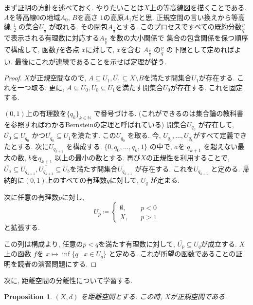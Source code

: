 \documentclass[lualatex]{ltjsbook}
\newcommand{\cl}[1]{\overline{ #1}  }
\newtheorem{proposition}[theorem]{Proposition}
\theoremstyle{remark}
\theoremstyle{plain}
\begin{document}
まず証明の方針を述べておく. やりたいことは$X$上の等高線図を描くことである.  $A$を等高線0の地域$A_0$, 
 $B$を高さ $1$の高原$A_1$だと思. 正規空間の言い換えから等高線 $\frac{1}{2}$ の集合$U_{\frac{1}{2}}$ が取れる. 
 その閉包$A_{\frac{1}{2}}$とする. このプロセスですべての既約分数$\frac{p}{q}$で表示される有理数に対応する$A_{\frac{p}{q}}$ を数の大小関係で
 集合の包含関係を保つ順序で構成して, 函数$f$を各点 $x$に対して,  $x$を含む $A_{\frac{p}{q}}$ の$\frac{p}{q}$ の下限として定めればよい. 
 最後にこれが連続であることを示せば定理が従う. 
\begin{proof}
  $X$が正規空間なので, $A\subseteq U_1, \cl{U_1} \subseteq X \setminus B $を満たす開集合$U_1$が存在する. これを一つ取る. 
  更に, $A \subseteq U_0, \cl{U_0} \subseteq U_1$を満たす開集合$U_0$が存在する. 
  これを固定する. 

  $(0,1)$上の有理数を$\{q_k\} _{k \in \mathbb{N}}$ で番号づける. (これができるのは集合論の教科書を参照すればわかるBernsteinの定理と呼ばれている)
  開集合$U_{q_0}$ が存在して, $\cl{U_0} \subseteq U_{q_0}$ かつ$\cl{U_{q_0}} \subseteq U_1$を満たす. 
  この$U_{q_0}$ を取る. 今, $U_{q_0}, \ldots , U_{q_{k}} $がすべて定義できたとする. 
  次に$U_{q_{k+1}}$ を構成する. $\{0, q_0, \ldots, q_k ,1\} $ の中で, $a$を $q_{k+1}$ を超えない最大の数, 
  $b$を$q_{k+1}$ 以上の最小の数とする. 再び$X$の正規性を利用することで,  $\cl{U_a} \subseteq U_{q_{k+1}}, \cl{U_{q_{k+1}}} \subseteq U_b$を満たす開集合$U_{q_{k+1}}$ が存在する. これを$U_{q_{k+1}}$ と定める. 
  帰納的に$(0,1)$上のすべての有理数$q$に対して,  $U_{q}$ が定まる. 
  
  次に任意の有理数$p$に対し,  
  $$U_p \coloneqq \begin{cases}
    \emptyset, \quad &p<0 \\
    X, \quad &p>1
  \end{cases}
  $$
  と拡張する. 

  この列は構成より, 任意の$p<q$を満たす有理数に対して,  $\cl{U_p} \subseteq U_q $が成立する. 
$X$上の函数 $f$を $x \mapsto \inf \{q  \mid x \in U_q\} $ と定める. これが所望の函数であることの証明を読者の演習問題にする. 

\end{proof}

次に, 距離空間の分離性について学習する. 

\begin{proposition}
\label{proposition:m-sp}
  $\left( X,d \right) $ を距離空間とする. この時, $X$が正規空間である. 
\end{proposition}
\end{document}
